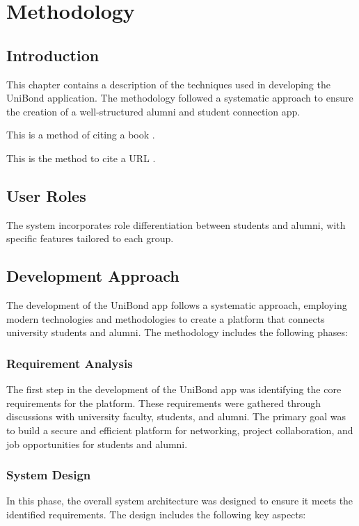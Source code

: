 


\chapter{Methodology}

\section{Introduction}
This chapter contains a description of the techniques used in developing the UniBond application. The methodology followed a systematic approach to ensure the creation of a well-structured alumni and student connection app.

This is a method of citing a book \cite{landau}.

This is the method to cite a URL \cite{pseudocode}.

\section{User Roles}
The system incorporates role differentiation between students and alumni, with specific features tailored to each group.

\section{Development Approach}
The development of the UniBond app follows a systematic approach, employing modern technologies and methodologies to create a platform that connects university students and alumni. The methodology includes the following phases:

\subsection{Requirement Analysis}
The first step in the development of the UniBond app was identifying the core requirements for the platform. These requirements were gathered through discussions with university faculty, students, and alumni. The primary goal was to build a secure and efficient platform for networking, project collaboration, and job opportunities for students and alumni.

\subsection{System Design}
In this phase, the overall system architecture was designed to ensure it meets the identified requirements. The design includes the following key aspects:

